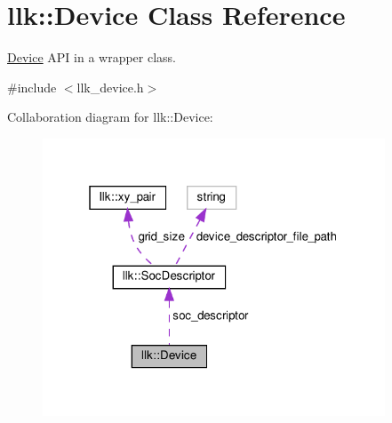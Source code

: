 \hypertarget{classllk_1_1Device}{}\section{llk\+:\+:Device Class Reference}
\label{classllk_1_1Device}


\hyperlink{classllk_1_1Device}{Device} A\+PI in a wrapper class.  




{\ttfamily \#include $<$llk\+\_\+device.\+h$>$}



Collaboration diagram for llk\+:\+:Device\+:\nopagebreak
\begin{figure}[H]
\begin{center}
\leavevmode
\includegraphics[width=289pt]{classllk_1_1Device__coll__graph}
\end{center}
\end{figure}
